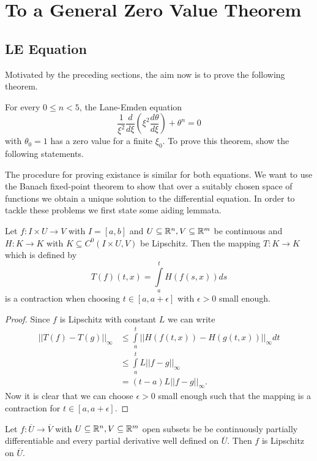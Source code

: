 \section{To a General Zero Value Theorem}
\subsection{LE Equation}
Motivated by the preceding sections, the aim now is to prove the following theorem.
\begin{theorem}
	\label{5-Zeroes-The-Lane-EmdenFiniteBoundary}
	For every $0\leq n<5$, the Lane-Emden equation
	\begin{equation}
		\frac{1}{\xi^2}\frac{d}{d\xi}\left(\xi^2\frac{d\theta}{d\xi}\right)+\theta^n=0
		\label{5-Zeroes-Equ-LEeq}
	\end{equation}
	with $\theta_0=1$ has a zero value for a finite $\xi_0$. To prove this theorem, show the following statements.
\end{theorem}\noindent
The procedure for proving existance is similar for both equations.
We want to use the Banach fixed-point theorem to show that over a suitably chosen space of functions we obtain a unique solution to the differential equation.
In order to tackle these problems we first state some aiding lemmata.
\begin{lemma}
	\label{5-Zeroes-Lem-Integral-Contraction}
	Let $f:I\times U\rightarrow V$ with $I=[a,b]$ and $U\subseteq\mathbb{R}^n,V\subseteq\mathbb{R}^m$ be continuous and $H:K\rightarrow K$ with $K\subseteq C^0(I\times U,V)$ be Lipschitz.
	Then the mapping $T:K\rightarrow K$ which is defined by
	\begin{equation}
		T(f)(t,x)=\int\limits_a^tH(f(s,x))ds
	\end{equation}
	is a contraction when choosing $t\in[a,a+\epsilon]$ with $\epsilon>0$ small enough.
\end{lemma}
\begin{proof}
	Since $f$ is Lipschitz with constant $L$ we can write
	\begin{align}
		||T(f)-T(g)||_\infty 	&\leq \int\limits_a^t||H(f(t,x))-H(g(t,x))||_\infty dt\\
								&\leq \int\limits_a^tL||f-g||_\infty\\
								&=(t-a)L||f-g||_\infty.
	\end{align}
	Now it is clear that we can choose $\epsilon>0$ small enough such that the mapping is a contraction for $t\in[a,a+\epsilon]$.
\end{proof}
\begin{lemma}
	\label{5-Zeroes-Lem-Lipschitz-Continuity-Differentiable}
	Let $f:\overline{U}\rightarrow \overline{V}$ with $U\subseteq\mathbb{R}^n,V\subseteq\mathbb{R}^m$ open subsets be be continuously partially differentiable and every partial derivative well defined on $\overline{U}$.
	Then $f$ is Lipschitz on $\overline{U}$.
\end{lemma}
